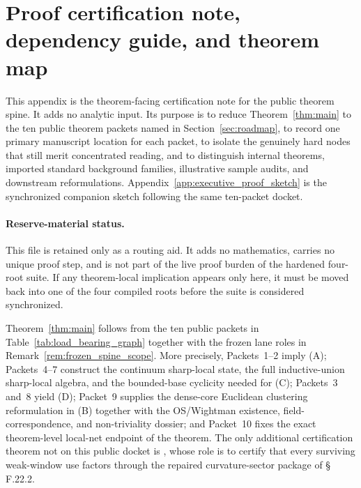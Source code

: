 \section{Proof certification note, dependency guide, and theorem map}
\label{app:referee_audit}

This appendix is the theorem-facing certification note for the public theorem spine.
It adds no analytic input.
Its purpose is to reduce Theorem~\ref{thm:main} to the ten public theorem packets named in Section~\ref{sec:roadmap}, to record one primary manuscript location for each packet, to isolate the genuinely hard nodes that still merit concentrated reading, and to distinguish internal theorems, imported standard background families, illustrative sample audits, and downstream reformulations.
Appendix~\ref{app:executive_proof_sketch} is the synchronized companion sketch following the same ten-packet docket.

\paragraph{Reserve-material status.}
This file is retained only as a routing aid. It adds no mathematics, carries no unique proof step, and is not part of the live proof burden of the hardened four-root suite. If any theorem-local implication appears only here, it must be moved back into one of the four compiled roots before the suite is considered synchronized.


\begin{theorem}
\label{thm:proof_spine_certification}


Theorem~\ref{thm:main} follows from the ten public packets in Table~\ref{tab:load_bearing_graph} together with the frozen lane roles in Remark~\ref{rem:frozen_spine_scope}.
More precisely, Packets~1--2 imply (A); Packets~4--7 construct the continuum sharp-local state, the full inductive-union sharp-local algebra, and the bounded-base cyclicity needed for (C); Packets~3 and~8 yield (D); Packet~9 supplies the dense-core Euclidean clustering reformulation in (B) together with the OS/Wightman existence, field-correspondence, and non-triviality dossier; and Packet~10 fixes the exact theorem-level local-net endpoint of the theorem.
The only additional certification theorem not on this public docket is , whose role is to certify that every surviving weak-window use factors through the repaired curvature-sector package of \S\,F.22.2.
\end{theorem}

